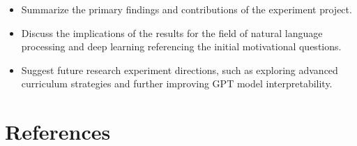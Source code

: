 \documentclass[12pt]{article}
\theoremstyle{plain}
\theoremstyle{definition}
\theoremstyle{remark}
\begin{document}
\begin{itemize}
  \item Summarize the primary findings and contributions of the experiment project.
  \item Discuss the implications of the results for the field of natural language processing and deep learning referencing the initial motivational questions.
  \item Suggest future research experiment directions, such as exploring advanced curriculum strategies and further improving GPT model interpretability.
\end{itemize}

%
%
\section{References}
\label{sec:references}

\end{document}
